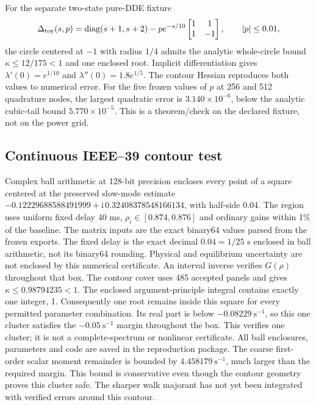 \documentclass[11pt]{article}
\newcommand{\diag}{\operatorname{diag}}
\newcommand{\ii}{\mathrm{i}}
\begin{document}
For the separate two-state pure-DDE fixture
\[
 \Delta_{\rm toy}(s,p)=
 \diag(s+1,s+2)-pe^{-s/10}
 \begin{bmatrix}1&1\\1&-1\end{bmatrix},\qquad |p|\le 0.01 ,
\]
the circle centered at $-1$ with radius $1/4$ admits the analytic
whole-circle bound $\kappa\le12/175<1$ and one enclosed root.
Implicit differentiation gives
$\lambda'(0)=e^{1/10}$ and $\lambda''(0)=1.8e^{1/5}$.
The contour Hessian reproduces both values to numerical error.
For the five frozen values of $p$ at 256 and 512 quadrature nodes,
the largest quadratic error is $3.140\times10^{-6}$, below the
analytic cubic-tail bound $5.770\times10^{-5}$.
This is a theorem/check on the declared fixture, not on the power grid.

\subsection{Continuous IEEE--39 contour test}
Complex ball arithmetic \cite{arb} at 128-bit precision encloses every point
of a square centered at the preserved slow-mode estimate
$-0.12229688588491999+\ii\,0.32408378548166134$, with half-side
0.04. The region uses uniform fixed delay 40 ms,
$\rho_i\in[0.874,0.876]$ and ordinary gains within 1\% of the
baseline. The matrix inputs are the exact binary64 values parsed
from the frozen exports. The fixed delay is the exact decimal
$0.04=1/25$ s enclosed in ball arithmetic, not its binary64 rounding.
Physical and equilibrium uncertainty
are not enclosed by this numerical certificate.
An interval inverse verifies $G(\rho)$ throughout that box.
The contour cover uses 485 accepted panels and gives
$\kappa\le 0.98794235<1$.
The enclosed argument-principle integral contains exactly one
integer, 1. Consequently one root remains inside this square for
every permitted parameter combination. Its real part is below
$-0.08229\ \mathrm{s}^{-1}$, so this one cluster satisfies the
$-0.05\ \mathrm{s}^{-1}$ margin throughout the box.
This verifies one cluster; it is not a complete-spectrum or nonlinear
certificate.
All ball enclosures, parameters and code are saved in the
reproduction package. The coarse first-order scalar moment remainder
is bounded by $4.458179\ \mathrm{s}^{-1}$, much larger than the
required margin. This bound is conservative even though the contour
geometry proves this cluster safe. The sharper walk majorant has
not yet been integrated with verified errors around this contour.
\end{document}
